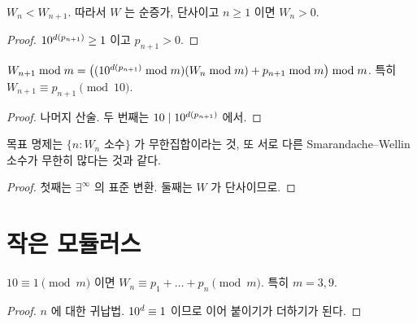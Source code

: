 \begin{lemma}[증가, B2]
  \label{lem:W-mono}
  \leanok
  \(W_n < W_{n+1}\). 따라서 \(W\) 는 순증가, 단사이고 \(n \ge 1\) 이면 \(W_n > 0\).
\end{lemma}
\begin{proof}
  \leanok
  \(10^{d(p_{n+1})} \ge 1\) 이고 \(p_{n+1} > 0\).
\end{proof}

\begin{lemma}
  \label{lem:W-mod}
  \leanok
  \(W_{n+1} \bmod m = \bigl((10^{d(p_{n+1})} \bmod m)(W_n \bmod m) + p_{n+1} \bmod m\bigr) \bmod m\).
  특히 \(W_{n+1} \equiv p_{n+1} \pmod{10}\).
\end{lemma}
\begin{proof}
  \leanok
  나머지 산술. 두 번째는 \(10 \mid 10^{d(p_{n+1})}\) 에서.
\end{proof}

\begin{theorem}[목표 명제의 다른 서술, B5]
  \label{thm:infinitude-iff}
  \leanok
  목표 명제는 \(\{n : W_n \text{ 소수}\}\) 가 무한집합이라는 것, 또 서로 다른 Smarandache--Wellin 소수가
  무한히 많다는 것과 같다.
\end{theorem}
\begin{proof}
  \leanok
  첫째는 \(\exists^\infty\) 의 표준 변환. 둘째는 \(W\) 가 단사이므로.
\end{proof}

\section{작은 모듈러스}

\begin{theorem}
  \label{thm:mod-sum}
  \leanok
  \(10 \equiv 1 \pmod m\) 이면 \(W_n \equiv p_1 + \dots + p_n \pmod m\). 특히 \(m = 3, 9\).
\end{theorem}
\begin{proof}
  \leanok
  \(n\) 에 대한 귀납법. \(10^{d} \equiv 1\) 이므로 이어 붙이기가 더하기가 된다.
\end{proof}

